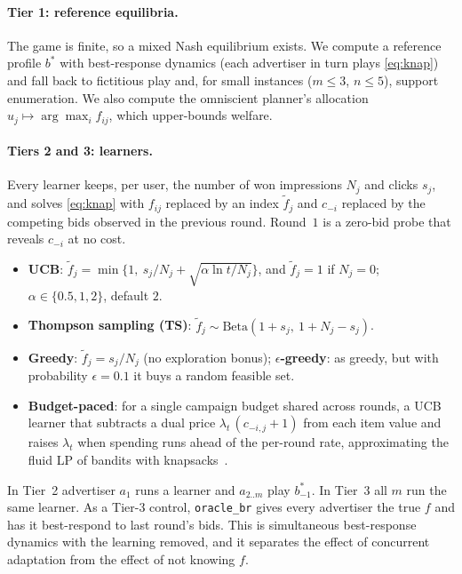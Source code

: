 \documentclass[11pt]{article}
\begin{document}
\paragraph{Tier 1: reference equilibria.} The game is finite, so a mixed Nash equilibrium exists. We
compute a reference profile $b^*$ with best-response dynamics (each advertiser in turn plays
\eqref{eq:knap}) and fall back to fictitious play and, for small instances ($m\le3$, $n\le5$), support
enumeration. We also compute the omniscient planner's allocation $u_j\mapsto\arg\max_i f_{ij}$, which
upper-bounds welfare.

\paragraph{Tiers 2 and 3: learners.} Every learner keeps, per user, the number of won impressions
$N_j$ and clicks $s_j$, and solves \eqref{eq:knap} with $f_{ij}$ replaced by an index $\tilde f_j$
and $c_{-i}$ replaced by the competing bids observed in the previous round. Round~$1$ is a zero-bid probe
that reveals $c_{-i}$ at no cost.
\begin{itemize}
  \item \textbf{UCB}: $\tilde f_j=\min\{1,\ s_j/N_j+\sqrt{\alpha\ln t/N_j}\}$, and $\tilde f_j=1$ if
        $N_j=0$; $\alpha\in\{0.5,1,2\}$, default $2$.
  \item \textbf{Thompson sampling (TS)}: $\tilde f_j\sim\mathrm{Beta}(1+s_j,\ 1+N_j-s_j)$.
  \item \textbf{Greedy}: $\tilde f_j=s_j/N_j$ (no exploration bonus); \textbf{$\epsilon$-greedy}: as
        greedy, but with probability $\epsilon=0.1$ it buys a random feasible set.
  \item \textbf{Budget-paced}: for a single campaign budget shared across rounds, a UCB learner that
        subtracts a dual price $\lambda_t\,(c_{-i,j}+1)$ from each item value and raises $\lambda_t$ when
        spending runs ahead of the per-round rate, approximating the fluid LP of bandits with
        knapsacks~\citep{badanidiyuru2013bandits,agrawal2014bandits}.
\end{itemize}
In Tier~2 advertiser $a_1$ runs a learner and $a_{2..m}$ play $b^*_{-1}$. In Tier~3 all $m$ run the
same learner. As a Tier-3 control, \texttt{oracle\_br} gives every advertiser the true $f$ and has it
best-respond to last round's bids. This is simultaneous best-response dynamics with the learning removed,
and it separates the effect of concurrent adaptation from the effect of not knowing $f$.
\end{document}
